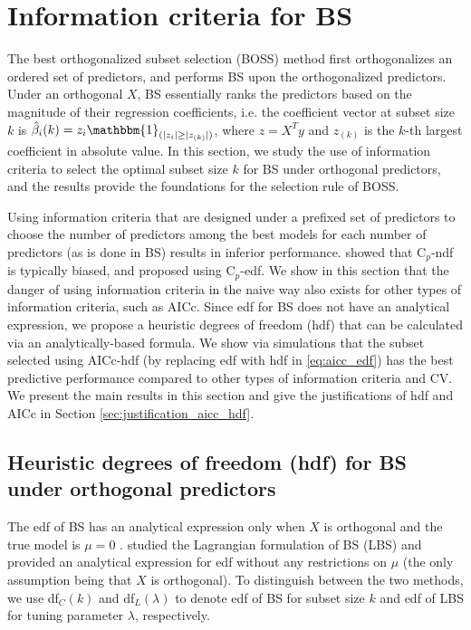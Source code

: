 
\section{Information criteria for BS}
\label{sec:ic_bs}

The best orthogonalized subset selection (BOSS) method first orthogonalizes an ordered set of predictors, and performs BS upon the orthogonalized predictors. Under an orthogonal $X$, BS essentially ranks the predictors based on the magnitude of their regression coefficients, i.e. the coefficient vector at subset size $k$ is $\hat{\beta}_i(k)=z_i \mathbbm{1}_{(|z_{i}| \ge |z_{(k)}|)}$, where $z=X^T y$ and $z_{(k)}$ is the $k$-th largest coefficient in absolute value. In this section, we study the use of information criteria to select the optimal subset size $k$ for BS under orthogonal predictors, and the results provide the foundations for the selection rule of BOSS. 

Using information criteria that are designed under a prefixed set of predictors to choose the number of predictors among the best models for each number of predictors (as is done in BS) results in inferior performance. \citet{Ye1998} showed that C$_p$-ndf is typically biased, and proposed using C$_p$-edf. We show in this section that the danger of using information criteria in the naive way also exists for other types of information criteria, such as AICc. Since edf for BS does not have an analytical expression, we propose a heuristic degrees of freedom (hdf) that can be calculated via an analytically-based formula. We show via simulations that the subset selected using AICc-hdf (by replacing edf with hdf in \eqref{eq:aicc_edf}) has the best predictive performance compared to other types of information criteria and CV. We present the main results in this section and give the justifications of hdf and AICc in Section \ref{sec:justification_aicc_hdf}.

\subsection{Heuristic degrees of freedom (hdf) for BS under orthogonal predictors}
\label{sec:hdf}

The edf of BS has an analytical expression only when $X$ is orthogonal and the true model is $\mu=0$ \citep{Ye1998}. \citet{Tibshirani2015} studied the Lagrangian formulation of BS (LBS) and provided an analytical expression for edf without any restrictions on $\mu$ (the only assumption being that $X$ is orthogonal). To distinguish between the two methods, we use df$_C(k)$ and df$_L(\lambda)$ to denote edf of BS for subset size $k$ and edf of LBS for tuning parameter $\lambda$, respectively. 

